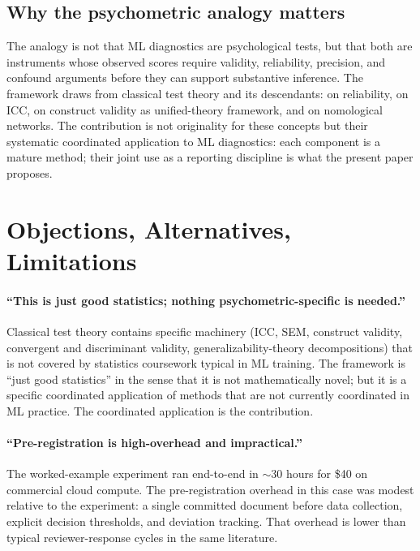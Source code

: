 \documentclass[10pt]{article}
\begin{document}
\subsection{Why the psychometric analogy matters}

The analogy is not that ML diagnostics are psychological tests,
but that both are instruments whose observed scores require
validity, reliability, precision, and confound arguments before
they can support substantive inference. The framework draws from
classical test theory and its descendants:
\citet{cronbach1951alpha} on reliability, \citet{shrout1979icc}
on ICC, \citet{messick1989validity,messick1995validity} on
construct validity as unified-theory framework, and
\citet{cronbachmeehl1955} on nomological networks. The
contribution is not originality for these concepts but their
systematic coordinated application to ML diagnostics: each
component is a mature method; their joint use as a reporting
discipline is what the present paper proposes.

\section{Objections, Alternatives, Limitations}
\label{sec:objections}

\paragraph{``This is just good statistics; nothing psychometric-specific
is needed.''} Classical test theory contains specific machinery
(ICC, SEM, construct validity, convergent and discriminant validity,
generalizability-theory decompositions) that is not covered by
statistics coursework typical in ML training. The framework is
``just good statistics'' in the sense that it is not mathematically
novel; but it is a specific coordinated application of methods that
are not currently coordinated in ML practice. The coordinated
application is the contribution.

\paragraph{``Pre-registration is high-overhead and impractical.''}
The worked-example experiment ran end-to-end in $\sim$30 hours for \$40
on commercial cloud compute. The pre-registration overhead in this
case was modest relative to the experiment: a single committed
document before data collection, explicit decision thresholds, and
deviation tracking. That overhead is lower than typical
reviewer-response cycles in the same literature.
\end{document}
